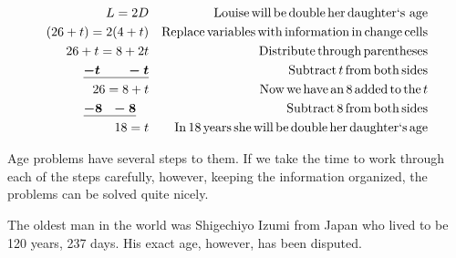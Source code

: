 \begin{example}
\begin{eqnarray*}
    L = 2 D &  & \operatorname{Louise} \operatorname{will} \operatorname{be} \operatorname{double} \operatorname{her}
    \operatorname{daughter`s~age}\\
    (26 + t) = 2 (4 + t) &  & \operatorname{Replace} \operatorname{variables} \operatorname{with}
    \operatorname{information} \operatorname{in} \operatorname{change} \operatorname{cells}\\
    26 + t = 8 + 2 t &  & \operatorname{Distribute} \operatorname{through}
    \operatorname{parentheses}\\
    \boldsymbol{\underline{- t ~~~~~~- t}} &  & \operatorname{Subtract} t \operatorname{from}
    \operatorname{both} \operatorname{sides}\\
    26 = 8 + t &  & \operatorname{Now} \operatorname{we} \operatorname{have} \operatorname{an} 8 \operatorname{added}
    \operatorname{to} \operatorname{the} t\\
    \underline{\boldsymbol{- 8 ~~- 8}}~~~ &  & \operatorname{Subtract} 8 \operatorname{from}
    \operatorname{both} \operatorname{sides}\\
    18 = t &  & \operatorname{In} 18 \operatorname{years} \operatorname{she} \operatorname{will} \operatorname{be}
    \operatorname{double} \operatorname{her} \operatorname{daughter`s} \operatorname{age}
  \end{eqnarray*}
\end{example}

 Age problems have several steps to them. If we take the time to work
through each of the steps carefully, however, keeping the information organized, the problems can be solved quite nicely.\pp

 {} The oldest man in the world was Shigechiyo Izumi from Japan who lived to be 120 years, 237 days. His exact age, however, has been disputed.